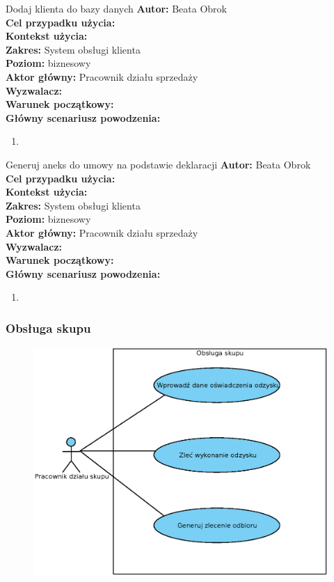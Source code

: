 	\begin{usecase}{Dodaj klienta do bazy danych}
		\textbf{Autor:} Beata Obrok \\
		\textbf{Cel przypadku użycia:} \\
		\textbf{Kontekst użycia:} \\
		\textbf{Zakres:} System obsługi klienta \\
		\textbf{Poziom:} biznesowy \\
		\textbf{Aktor główny:} Pracownik działu sprzedaży \\
		\textbf{Wyzwalacz:} \\
		\textbf{Warunek początkowy:} \\
		\textbf{Główny scenariusz powodzenia:} \\
			\begin{enumerate}
				\item
			\end{enumerate}
	\end{usecase}

	\begin{usecase}{Generuj aneks do umowy na podstawie deklaracji}
		\textbf{Autor:} Beata Obrok \\
		\textbf{Cel przypadku użycia:} \\
		\textbf{Kontekst użycia:} \\
		\textbf{Zakres:} System obsługi klienta \\
		\textbf{Poziom:} biznesowy \\
		\textbf{Aktor główny:} Pracownik działu sprzedaży \\
		\textbf{Wyzwalacz:} \\
		\textbf{Warunek początkowy:} \\
		\textbf{Główny scenariusz powodzenia:} \\
			\begin{enumerate}
				\item
			\end{enumerate}
	\end{usecase}

\subsubsection{Obsługa skupu}

	\begin{figure}[H]
		\centering
		\includegraphics[width=.8\textwidth]{img/UC/skup.eps}
	\end{figure}

